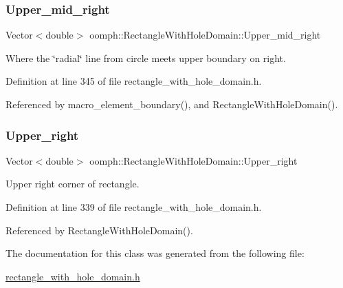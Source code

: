 \subsubsection{\texorpdfstring{Upper\+\_\+mid\+\_\+right}{Upper\_mid\_right}}
{\footnotesize\ttfamily Vector$<$double$>$ oomph\+::\+Rectangle\+With\+Hole\+Domain\+::\+Upper\+\_\+mid\+\_\+right\hspace{0.3cm}{\ttfamily [private]}}



Where the \char`\"{}radial\char`\"{} line from circle meets upper boundary on right. 



Definition at line 345 of file rectangle\+\_\+with\+\_\+hole\+\_\+domain.\+h.



Referenced by macro\+\_\+element\+\_\+boundary(), and Rectangle\+With\+Hole\+Domain().

\mbox{\label{classoomph_1_1RectangleWithHoleDomain_a3bc6d59a004c8fe1b634b43b6665c9b9}} 
\subsubsection{\texorpdfstring{Upper\+\_\+right}{Upper\_right}}
{\footnotesize\ttfamily Vector$<$double$>$ oomph\+::\+Rectangle\+With\+Hole\+Domain\+::\+Upper\+\_\+right\hspace{0.3cm}{\ttfamily [private]}}



Upper right corner of rectangle. 



Definition at line 339 of file rectangle\+\_\+with\+\_\+hole\+\_\+domain.\+h.



Referenced by Rectangle\+With\+Hole\+Domain().



The documentation for this class was generated from the following file\+:\begin{DoxyCompactItemize}
\item 
\hyperlink{rectangle__with__hole__domain_8h}{rectangle\+\_\+with\+\_\+hole\+\_\+domain.\+h}\end{DoxyCompactItemize}
